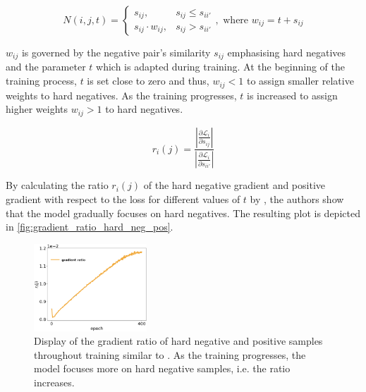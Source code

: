 \begin{equation}
    N(i,j,t) = \left\{\begin{array}{ll} s_{ij}, & s_{ij} \le s_{ii'} \\
        s_{ij} \cdot  w_{ij}, & s_{ij} > s_{ii'}\end{array}\right. ,\text{ where }w_{ij} = t + s_{ij}
    \label{eq:curricular_negative_weighting}
\end{equation}

$w_{ij}$ is governed by the negative pair's similarity $s_{ij}$ emphasising hard negatives 
and the parameter $t$ which is adapted during training.
At the beginning of the training process, $t$ is set close to zero and thus, $w_{ij} < 1$ 
to assign smaller relative weights to hard negatives.
As the training progresses, $t$ is increased to assign higher weights $w_{ij} > 1$ to hard negatives.

\begin{equation}
    r_i(j) = \frac{\left| \frac{\partial \mathcal{L}_i}{\partial s_{ij}} \right|}
    {\left| \frac{\partial \mathcal{L}_i}{\partial s_{ii'}} \right|}
    \label{eq:curricular_weighting_ratio}
\end{equation}


By calculating the ratio $r_i(j)$ of the hard negative gradient and positive gradient 
with respect to the loss for different values of $t$ by , 
the authors show that the model gradually focuses on hard negatives.
The resulting plot is depicted in \autoref{fig:gradient_ratio_hard_neg_pos}.

\begin{figure}[!htb] %
    \centering
    \includegraphics[width=120pt]{images/ratio_hard_neg_pos_gradients_only_ratio.png}
    \caption{Display of the gradient ratio of hard negative and positive samples throughout training 
    similar to \citet{curricular_weighting_2024}.
    As the training progresses, the model focuses more on hard negative samples, i.e. the ratio increases.
    }
    \label{fig:gradient_ratio_hard_neg_pos}
\end{figure}

